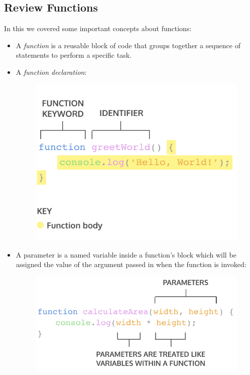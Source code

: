 \documentclass[11pt]{article}
\begin{document}
\subsection{Review Functions}
In this we covered some important concepts about functions:
\begin{itemize}[leftmargin = *]
\item A \textit{function} is a reusable block of code that groups together a sequence of statements to perform a specific task.
\item A \textit{function declaration}:
\vspace{-4mm}
\begin{figure}[H]
\includegraphics[scale = 0.73]{4_1}
\centering
\end{figure}
\item A parameter is a named variable inside a function’s block which will be assigned the value of the argument passed in when the function is invoked: 
\begin{figure}[H]
\includegraphics[scale = 0.75]{4_4}

\end{figure}
\end{itemize}
\end{document}
